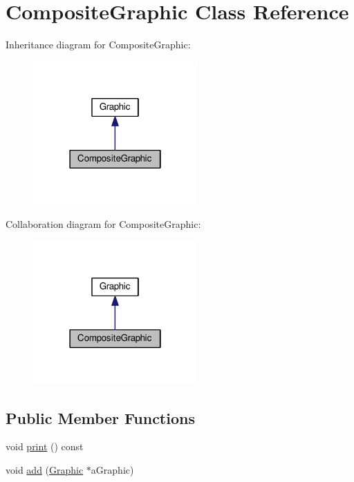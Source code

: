 \hypertarget{classCompositeGraphic}{}\section{Composite\+Graphic Class Reference}
\label{classCompositeGraphic}


Inheritance diagram for Composite\+Graphic\+:
\nopagebreak
\begin{figure}[H]
\begin{center}
\leavevmode
\includegraphics[width=178pt]{classCompositeGraphic__inherit__graph}
\end{center}
\end{figure}


Collaboration diagram for Composite\+Graphic\+:
\nopagebreak
\begin{figure}[H]
\begin{center}
\leavevmode
\includegraphics[width=178pt]{classCompositeGraphic__coll__graph}
\end{center}
\end{figure}
\subsection*{Public Member Functions}
\begin{DoxyCompactItemize}
\item 
void \hyperlink{classCompositeGraphic_a0aa29ff6471a74e221c7acf2b2a4cdd4}{print} () const 
\item 
void \hyperlink{classCompositeGraphic_afd74074a4c4429f63585aea1363dd1aa}{add} (\hyperlink{classGraphic}{Graphic} $\ast$a\+Graphic)
\end{DoxyCompactItemize}
